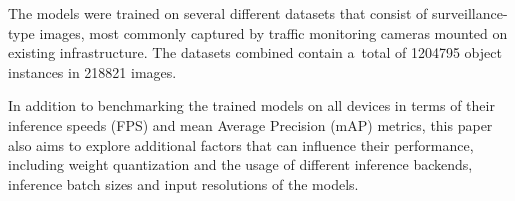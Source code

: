 The models were trained on several different datasets that consist of
surveillance-type images, most commonly captured by traffic monitoring cameras
mounted on existing infrastructure. The datasets combined contain a~total of
\num{1204795} object instances in \num{218821} images.


In addition to benchmarking the trained models on all devices in terms of their
inference speeds (FPS) and mean Average Precision (mAP) metrics, this paper also
aims to explore additional factors that can influence their performance,
including weight quantization and the usage of different inference backends,
inference batch sizes and input resolutions of the models.

